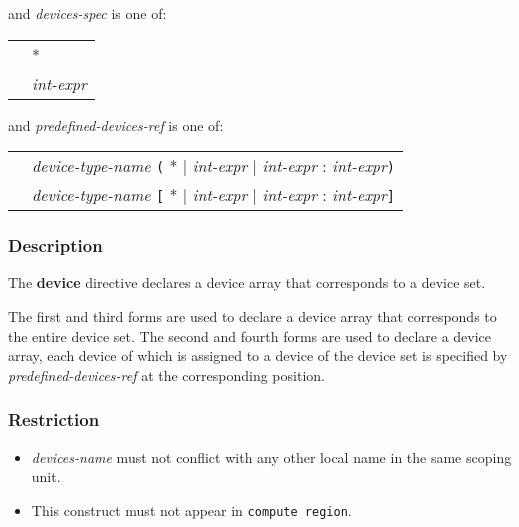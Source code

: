 \vspace{1em}
and {\it devices-spec} is one of:
\vspace{1em}

\begin{tabular}{ll}
 \hspace{0.5cm} & * \\
                & {\it int-expr}
\end{tabular}

\vspace{1em}
and {\it predefined-devices-ref} is one of:
\vspace{1em}

\begin{tabular}{ll}
  \hspace{0.5cm} & {\it device-type-name} \verb|(| * $\vert$ {\it int-expr} $\vert$ {\it int-expr} : {\it int-expr}\verb|)| \\
                 & {\it device-type-name} \verb|[| * $\vert$ {\it int-expr} $\vert$ {\it int-expr} : {\it int-expr}\verb|]|
\end{tabular}

\subsubsection*{Description}
The {\bf device} directive declares a device array that corresponds to a device set.

The first and third forms are used to declare a device array that corresponds to the entire device set.
The second and fourth forms are used to declare a device array, each device of which is
assigned to a device of the device set is specified by {\it predefined-devices-ref} at the corresponding position.


\subsubsection*{Restriction}
\begin{itemize}
\item {\it devices-name} must not conflict with any other local name in
      the same scoping unit.
 \item This construct must not appear in {\OACC} {\tt compute region}.
\end{itemize}

